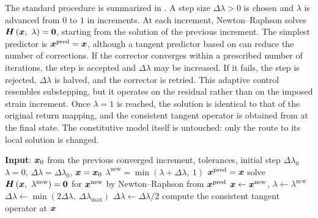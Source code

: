 The standard procedure is summarized in .
A step size $\Delta\lambda>0$ is chosen and $\lambda$ is advanced from $0$ to $1$ in increments.
At each increment, Newton--Raphson solves $\bm{H}\left(\bm{x},~\lambda\right)=\bm{0}$, starting from the solution of the previous increment.
The simplest predictor is $\bm{x}^\text{pred}=\bm{x}$, although a tangent predictor based on  can reduce the number of corrections.
If the corrector converges within a prescribed number of iterations, the step is accepted and $\Delta\lambda$ may be increased.
If it fails, the step is rejected, $\Delta\lambda$ is halved, and the corrector is retried.
This adaptive control resembles substepping, but it operates on the residual rather than on the imposed strain increment.
Once $\lambda=1$ is reached, the solution is identical to that of the original return mapping, and the consistent tangent operator is obtained from  at the final state.
The constitutive model itself is untouched: only the route to its local solution is changed.
\begin{breakablealgorithm}
\caption{homotopy-continuation return mapping}\label{alg:homotopy}
\begin{algorithmic}[1]
\State \textbf{Input}: $\bm{x}_0$ from the previous converged increment, tolerances, initial step $\Delta\lambda_0$
\State $\lambda=0$, $\Delta\lambda=\Delta\lambda_0$, $\bm{x}=\bm{x}_0$
\State $\lambda^\text{new}=\min\left(\lambda+\Delta\lambda,~1\right)$
\State $\bm{x}^\text{pred}=\bm{x}$
\State solve $\bm{H}\left(\bm{x},~\lambda^\text{new}\right)=\bm{0}$ for $\bm{x}^\text{new}$ by Newton--Raphson from $\bm{x}^\text{pred}$
\State $\bm{x}\leftarrow\bm{x}^\text{new}$, $\lambda\leftarrow\lambda^\text{new}$
\State $\Delta\lambda\leftarrow\min\left(2\Delta\lambda,~\Delta\lambda_\text{max}\right)$
\Else
\State $\Delta\lambda\leftarrow\Delta\lambda/2$
\EndIf
\EndWhile
\State compute the consistent tangent operator at $\bm{x}$
\end{algorithmic}
\end{breakablealgorithm}

